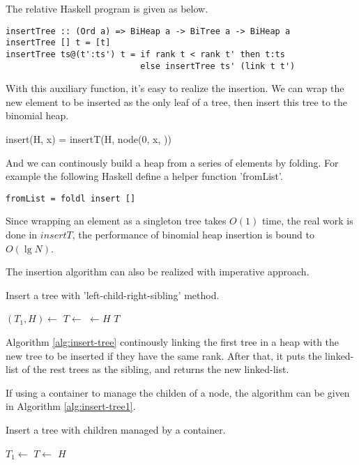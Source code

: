 \documentclass{article}
\begin{document}
The relative Haskell program is given as below.

\lstset{language=Haskell}
\begin{lstlisting}
insertTree :: (Ord a) => BiHeap a -> BiTree a -> BiHeap a
insertTree [] t = [t]
insertTree ts@(t':ts') t = if rank t < rank t' then t:ts
                           else insertTree ts' (link t t')
\end{lstlisting}

With this auxiliary function, it's easy to realize the insertion.
We can wrap the new element to be inserted as the only leaf of a tree,
then insert this tree to the binomial heap.

\be
insert(H, x) = insertT(H, node(0, x, \phi))
\ee

And we can continously build a heap from a series of elements by folding.
For example the following Haskell define a helper function 'fromList'.

\begin{lstlisting}
fromList = foldl insert []
\end{lstlisting}

Since wrapping an element as a singleton tree takes $O(1)$ time, 
the real work is done in $insertT$, the performance of binomial
heap insertion is bound to $O(\lg N)$.

The insertion algorithm can also be realized with imperative approach.

\begin{algorithm}
\caption{Insert a tree with 'left-child-right-sibling' method.}
\label{alg:insert-tree}
\begin{algorithmic}[1]
    \State $(T_1, H) \gets$ 
    \State $T \gets $ 
  \EndWhile
  \State {} $\gets H$
  \State \Return $T$
\EndFunction
\end{algorithmic}
\end{algorithm}

Algorithm \ref{alg:insert-tree} continously linking the first tree
in a heap with the new tree to be inserted if they have the same rank.
After that, it puts the linked-list of the rest trees as the sibling,
and returns the new linked-list.

If using a container to manage the childen of a node, the algorithm
can be given in Algorithm \ref{alg:insert-tree1}.

\begin{algorithm}
\caption{Insert a tree with children managed by a container.}
\label{alg:insert-tree1}
\begin{algorithmic}[1]
    \State $T_1 \gets$ 
    \State $T \gets $ 
  \EndWhile
  \State {}
  \State \Return $H$
\EndFunction
\end{algorithmic}
\end{algorithm}
\end{document}
